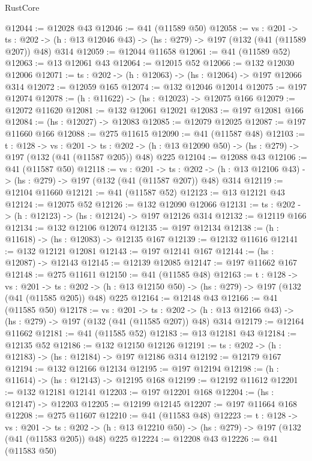 \begin{lexlean}{RustCore}
\begin{coremodule}
@12044 := @12028 @43
@12046 := @41 (@11589 @50)
@12058 := {vs : @201} ->
  {ts : @202} -> (h : @13 @12046 @43) -> (hs : @279) -> @197 (@132 (@41 (@11589 @207)) @48) @314
@12059 := @12044 @11658
@12061 := @41 (@11589 @52)
@12063 := @13 @12061 @43
@12064 := @12015 @52
@12066 := @132 @12030 @12006
@12071 := {ts : @202} -> (h : @12063) -> (hs : @12064) -> @197 @12066 @314
@12072 := @12059 @165
@12074 := @132 @12046 @12014
@12075 := @197 @12074
@12078 := (h : @11622) -> (hs : @12023) -> @12075 @166
@12079 := @12072 @11620
@12081 := @132 @12061 @12021
@12083 := @197 @12081 @166
@12084 := (hs : @12027) -> @12083
@12085 := @12079 @12025
@12087 := @197 @11660 @166
@12088 := @275 @11615
@12090 := @41 (@11587 @48)
@12103 := {t : @128} ->
  {vs : @201} ->
  {ts : @202} -> (h : @13 @12090 @50) -> (hs : @279) -> @197 (@132 (@41 (@11587 @205)) @48) @225
@12104 := @12088 @43
@12106 := @41 (@11587 @50)
@12118 := {vs : @201} ->
  {ts : @202} -> (h : @13 @12106 @43) -> (hs : @279) -> @197 (@132 (@41 (@11587 @207)) @48) @314
@12119 := @12104 @11660
@12121 := @41 (@11587 @52)
@12123 := @13 @12121 @43
@12124 := @12075 @52
@12126 := @132 @12090 @12066
@12131 := {ts : @202} -> (h : @12123) -> (hs : @12124) -> @197 @12126 @314
@12132 := @12119 @166
@12134 := @132 @12106 @12074
@12135 := @197 @12134
@12138 := (h : @11618) -> (hs : @12083) -> @12135 @167
@12139 := @12132 @11616
@12141 := @132 @12121 @12081
@12143 := @197 @12141 @167
@12144 := (hs : @12087) -> @12143
@12145 := @12139 @12085
@12147 := @197 @11662 @167
@12148 := @275 @11611
@12150 := @41 (@11585 @48)
@12163 := {t : @128} ->
  {vs : @201} ->
  {ts : @202} -> (h : @13 @12150 @50) -> (hs : @279) -> @197 (@132 (@41 (@11585 @205)) @48) @225
@12164 := @12148 @43
@12166 := @41 (@11585 @50)
@12178 := {vs : @201} ->
  {ts : @202} -> (h : @13 @12166 @43) -> (hs : @279) -> @197 (@132 (@41 (@11585 @207)) @48) @314
@12179 := @12164 @11662
@12181 := @41 (@11585 @52)
@12183 := @13 @12181 @43
@12184 := @12135 @52
@12186 := @132 @12150 @12126
@12191 := {ts : @202} -> (h : @12183) -> (hs : @12184) -> @197 @12186 @314
@12192 := @12179 @167
@12194 := @132 @12166 @12134
@12195 := @197 @12194
@12198 := (h : @11614) -> (hs : @12143) -> @12195 @168
@12199 := @12192 @11612
@12201 := @132 @12181 @12141
@12203 := @197 @12201 @168
@12204 := (hs : @12147) -> @12203
@12205 := @12199 @12145
@12207 := @197 @11664 @168
@12208 := @275 @11607
@12210 := @41 (@11583 @48)
@12223 := {t : @128} ->
  {vs : @201} ->
  {ts : @202} -> (h : @13 @12210 @50) -> (hs : @279) -> @197 (@132 (@41 (@11583 @205)) @48) @225
@12224 := @12208 @43
@12226 := @41 (@11583 @50)

\end{coremodule}
\end{lexlean}
